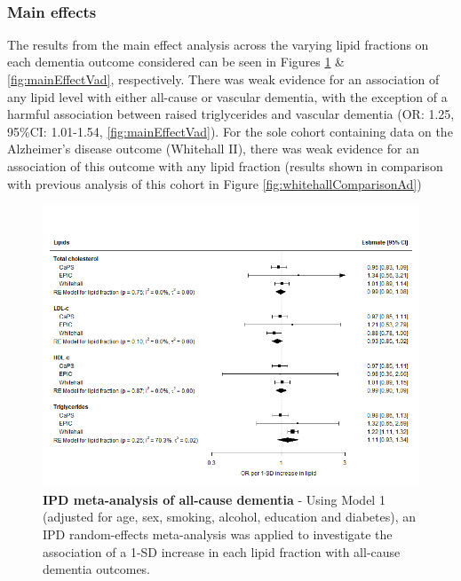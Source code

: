 \documentclass[a4paper, twoside]{templates/ociamthesis}
\begin{document}
~

\hypertarget{main-effects}{%
\subsubsection{Main effects}\label{main-effects}}

The results from the main effect analysis across the varying lipid fractions on each dementia outcome considered can be seen in Figures \ref{fig:mainEffectDem} \& \ref{fig:mainEffectVad}, respectively. There was weak evidence for an association of any lipid level with either all-cause or vascular dementia, with the exception of a harmful association between raised triglycerides and vascular dementia (OR: 1.25, 95\%CI: 1.01-1.54, \ref{fig:mainEffectVad}). For the sole cohort containing data on the Alzheimer's disease outcome (Whitehall II), there was weak evidence for an association of this outcome with any lipid fraction (results shown in comparison with previous analysis of this cohort in Figure \ref{fig:whitehallComparisonAd})





\begin{figure}[H]
\includegraphics[width=1\linewidth]{figures/ipd/main_Dementia} \caption[IPD meta-analysis of all-cause dementia]{\textbf{IPD meta-analysis of all-cause dementia} - Using Model 1 (adjusted for age, sex, smoking, alcohol, education and diabetes), an IPD random-effects meta-analysis was applied to investigate the association of a 1-SD increase in each lipid fraction with all-cause dementia outcomes.}\label{fig:mainEffectDem}
\end{figure}
\end{document}
